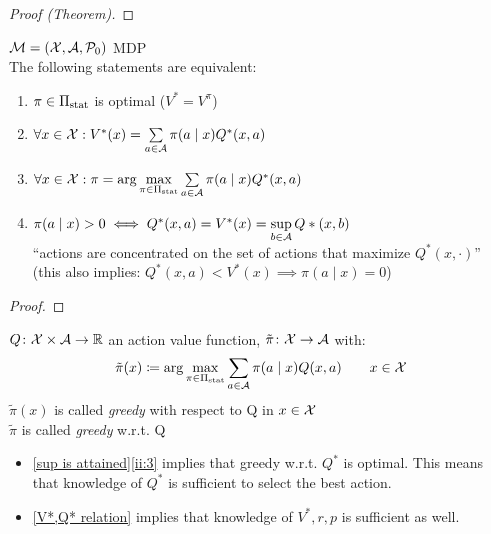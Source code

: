 \begin{proof}[Proof (Theorem)]
\end{proof}


\begin{prop}\label{sup is attained}\(\mathcal{M}=(\mathcal{X},\mathcal{A},\mathcal{P}_0)\) MDP\\
The following statements are equivalent:
\begin{enumerate}[label={(\roman*)},font=\normalfont]
\item \(\pi \in\Pi_{\textnormal{stat}}\) is optimal (\(V^*=V^\pi\))
\item \(\forall x\in\mathcal{X}: V^*(x)=\sum\limits_{a\in\mathcal{A}}\pi(a\mid x)Q^*(x,a)\)
\item\label{ii:3} \(\forall x\in\mathcal{X}: \pi=\arg\max\limits_{\pi\in\Pi_{\textnormal{stat}}}\sum\limits_{a\in\mathcal{A}}\pi(a\mid x)Q^*(x,a) \)
\item \(\pi(a\mid x)>0 \iff Q^*(x,a)=V^*(x) =\sup\limits_{b\in\mathcal{A}}Q*(x,b)\) \\
	``actions are concentrated on the set of actions that maximize \(Q^*(x,\cdot)\)''\\
	(this also implies: \(Q^*(x,a)<V^*(x) \implies \pi(a\mid x)=0\))
\end{enumerate}
\end{prop}

\begin{proof}
\end{proof}


\begin{definition}
	\(Q\colon\mathcal{X}\times\mathcal{A}\to\mathbb{R}\) an action value function, \(\tilde{\pi}\colon\mathcal{X}\to\mathcal{A}\) with:
	\[
	\tilde{\pi}(x)\coloneqq\arg\max_{\pi\in\Pi_{\textnormal{stat}}}\sum_{a\in\mathcal{A}}\pi(a\mid x) Q(x,a)\qquad x\in\mathcal{X}
	\]
	\(\tilde{\pi}(x)\) is called \emph{greedy} with respect to Q in \(x\in\mathcal{X}\)\\
	\(\tilde{\pi}\) is called \emph{greedy} w.r.t. Q
\end{definition}


\begin{remark}\leavevmode
	\begin{itemize}
	\item \ref{sup is attained}\ref{ii:3} implies that greedy w.r.t. \(Q^*\) is optimal. 
	This means that knowledge of \(Q^*\) is sufficient to select the best action.
	\item \ref{V*,Q* relation} implies that knowledge of \(V^*,r,p\) is sufficient as well.
	\end{itemize}
\end{remark}
\endinput
